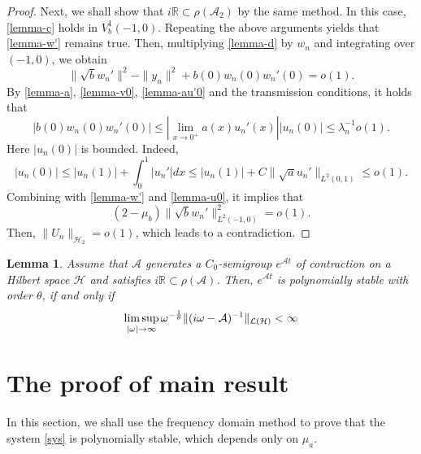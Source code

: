\documentclass[twoside]{article}
\newtheorem{lemma}[definition]{Lemma}
\theoremstyle{noparens}
\theoremstyle{definition}
\numberwithin{equation}{section}
\numberwithin{figure}{section}
\begin{document}
\begin{proof}
Next, we shall show that $i\mathbb R\subset\rho(\mathcal A_2)$ by the same method. In this case, \eqref{lemma-c} holds in $V_b^1(-1,0)$. Repeating the above arguments yields that \eqref{lemma-w'} remains true. Then, multiplying \eqref{lemma-d} by $w_n$ and integrating over $(-1,0)$, we obtain
\begin{equation}
	\|\sqrt{b}w_n'\|^2 - \|y_n\|^2 + b(0)w_n(0)w_n'(0)= o(1).
\end{equation}
By \eqref{lemma-a}, \eqref{lemma-v0}, \eqref{lemma-au'0} and the transmission conditions, it holds that
$$|b(0)w_n(0)w_n'(0)|\leq \left|\lim_{x\to0^+}a(x)u_n'(x)\right||u_n(0)|\leq \lambda_n^{-1}o(1).$$
Here $|u_n(0)|$ is bounded. Indeed,
\begin{equation}\label{lemma-u0}
	|u_n(0)|\leq |u_n(1)|+\int_0^1|u_n'| dx\leq |u_n(1)| +
	C\|\sqrt{a}u_n'\|_{L^2(0,1)} \leq o(1).
\end{equation}
Combining with \eqref{lemma-w'} and \eqref{lemma-u0}, it implies that
$$(2-\mu_b)\|\sqrt{b}w_n'\|_{L^2(-1,0)}^2 = o(1). $$
Then, $\|U_n\|_{\mathcal H_2} = o(1)$, which leads to a contradiction.
\end{proof}
\begin{lemma}\label{Tomilov}
\cite{Tomilov} Assume that $\mathcal A$ generates a $C_0$-semigroup $e^{\mathcal At}$ of contraction on a Hilbert space $\mathcal H$ and satisfies $i\mathbb R \subset\rho(\mathcal A)$. Then, $e^{\mathcal At}$ is polynomially stable with order $\theta$, if and only if
\begin{equation}
	\limsup_{|\omega|\rightarrow\infty}
	\omega^{-{1\over \theta}} \|(i\omega-\mathcal A)^{-1}\|_{\mathcal L(\mathcal H)} < \infty
\end{equation}
\end{lemma}
\section{The proof of main result}
In this section, we shall use the frequency domain method to prove that the system \eqref{sys} is polynomially stable, which depends only on $\mu_a$.
\end{document}
